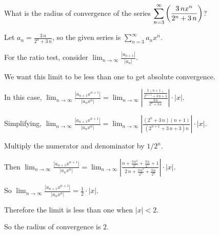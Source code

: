 \documentclass{ximera}
\begin{document}
\begin{question}
  What is the radius of convergence of the series \(\displaystyle\displaystyle\sum_{n=3}^\infty \left( \displaystyle\frac{3 \, n x^{n} }{2^{n} + 3 \, n} \right)\)?
  
  \begin{solution}
    \begin{hint}
      Let \(a_{n} = \displaystyle\frac{3 \, n}{2^{n} + 3 \, n}\), so the given series is \(\displaystyle\sum_{n=3}^\infty a_{n} x^{n}\).
    \end{hint}
    \begin{hint}
      For the ratio test, consider \(\lim_{n \to \infty} \displaystyle\frac{|a_{n+1}|}{|a_{n}|}\).
    \end{hint}
    \begin{hint}
      We want this limit to be less than one to get absolute convergence.
    \end{hint}
    \begin{hint}
      In this case, \(\lim_{n \to \infty} \displaystyle\frac{|a_{n+1} x^{n+1}|}{|a_{n} x^{n}|} = \lim_{n \to \infty} \left| \displaystyle\frac{\displaystyle\frac{3 \, {\left(n + 1\right)} }{2^{n + 1} + 3 \, n + 3} }{\displaystyle\frac{3 \, n}{2^{n} + 3 \, n} } \right| \cdot \left| x \right|\).
    \end{hint}
    \begin{hint}
      Simplifying, \(\lim_{n \to \infty} \displaystyle\frac{|a_{n+1} x^{n+1}|}{|a_{n} x^{n}|} = \lim_{n \to \infty} \left| \displaystyle\frac{ {\left(2^{n} + 3 \, n\right)} {\left(n + 1\right)} }{ {\left(2^{n + 1} + 3 \, n + 3\right)} n} \right| \cdot \left| x \right|\).
    \end{hint}
    \begin{hint}
      Multiply the numerator and denominator by \(1/2^n\).
    \end{hint}
    \begin{hint}
      Then \(\lim_{n \to \infty} \displaystyle\frac{|a_{n+1} x^{n+1}|}{|a_{n} x^{n}|} = \lim_{n \to \infty} \left| 
        \displaystyle\frac{n + \displaystyle\frac{3 \, n^{2} }{2^{n} } + \displaystyle\frac{3 \, n}{2^{n} } + 1}{2 \, n + \displaystyle\frac{3 \, n^{2} }{2^{n} } + \displaystyle\frac{3 \, n}{2^{n} }} \right| \cdot \left| x \right|\).
    \end{hint}
    \begin{hint}
      So \(\lim_{n \to \infty} \displaystyle\frac{|a_{n+1} x^{n+1}|}{|a_{n} x^{n}|} = \displaystyle\frac{1}{2} \cdot \left| x \right|\).
    \end{hint}
    \begin{hint}
      Therefore the limit is less than one when \(\left| x \right| < 2\).
    \end{hint}
    \begin{hint}
      So the radius of convergence is \(2\).
    \end{hint}


\end{solution}
\end{question}
\end{document}
